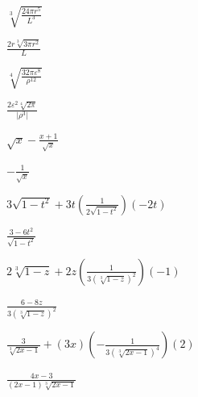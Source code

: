 \documentclass{ximera}
\begin{document}
\begin{question}
\begin{problem}
$\sqrt[3]{\frac{24 \pi r^5}{L^3}}$

\begin{solution}
$\frac{2r \sqrt[3]{3 \pi r^2}}{L}$ 
\end{solution}
\end{problem}

\begin{problem}
$\sqrt[4]{\frac{32 \pi \varepsilon^8}{\rho^{12}}}$

\begin{solution}
 $\frac{2 \varepsilon^2 \sqrt[4]{2\pi}}{|\rho^3|}$ 
\end{solution}

\end{problem}

\begin{problem}
$\sqrt{x} - \frac{x+1}{\sqrt{x}}$

\begin{solution}
 $-\frac{1}{\sqrt{x}}$ 
\end{solution}
\end{problem}

\begin{problem}
$3 \sqrt{1-t^2} + 3t\left(\frac{1}{2 \sqrt{1-t^2}}\right)(-2t)$

\begin{solution}
$\frac{3-6t^2}{\sqrt{1-t^2}}$
\end{solution}
\end{problem}

 \begin{problem}
 $2 \sqrt[3]{1-z} + 2z \left(\frac{1}{3 \left(\sqrt[3]{1-z}\right)^2}\right)(-1)$

\begin{solution}
$\frac{6-8z}{3 (\sqrt[3]{1-z})^2}$
\end{solution}
\end{problem}

\begin{problem} \label{simpradlast}
$\frac{3}{\sqrt[3]{2x-1}} + (3x)\left(-\frac{1}{3 \left(\sqrt[3]{2x-1} \right)^4}\right)(2)$

\begin{solution}
 $\frac{4x-3}{(2x-1)\sqrt[3]{2x-1}}$  
\end{solution}
\end{problem}

\end{question}
\end{document}
